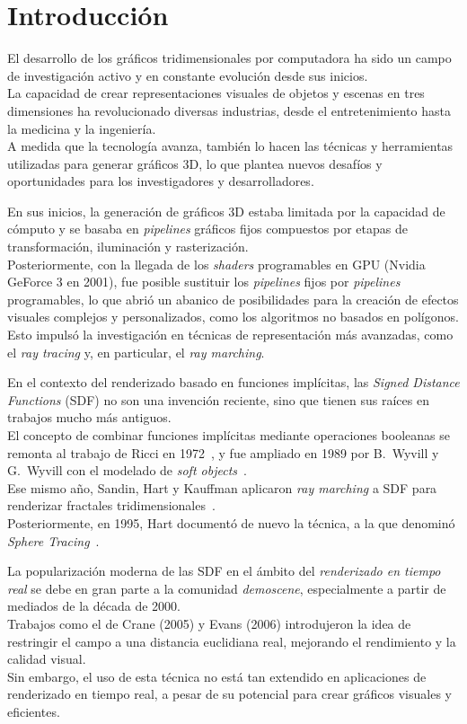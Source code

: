 \chapter{Introducción}
El desarrollo de los gráficos tridimensionales por computadora ha sido un campo
de investigación activo y en constante evolución desde sus inicios.\\ La
capacidad de crear representaciones visuales de objetos y escenas en tres
dimensiones ha revolucionado diversas industrias, desde el entretenimiento
hasta la medicina y la ingeniería.\\ A medida que la tecnología avanza, también
lo hacen las técnicas y herramientas utilizadas para generar gráficos 3D, lo
que plantea nuevos desafíos y oportunidades para los investigadores y
desarrolladores.

En sus inicios, la generación de gráficos 3D estaba limitada por la capacidad
de cómputo y se basaba en \textit{pipelines} gráficos fijos compuestos por
etapas de transformación, iluminación y rasterización.\\ Posteriormente, con la
llegada de los \textit{shaders} programables en GPU (Nvidia GeForce 3 en 2001),
fue posible sustituir los \textit{pipelines} fijos por \textit{pipelines}
programables, lo que abrió un abanico de posibilidades para la creación de
efectos visuales complejos y personalizados, como los algoritmos no basados en
polígonos.\\ Esto impulsó la investigación en técnicas de representación más
avanzadas, como el \textit{ray tracing} y, en particular, el \textit{ray
    marching}.

En el contexto del renderizado basado en funciones implícitas, las
\textit{Signed Distance Functions} (SDF) no son una invención reciente, sino
que tienen sus raíces en trabajos mucho más antiguos.\\ El concepto de combinar
funciones implícitas mediante operaciones booleanas se remonta al trabajo de
Ricci en 1972~\cite{Ricci:1973:CGC}, y fue ampliado en 1989 por B.~Wyvill y
G.~Wyvill con el modelado de \textit{soft objects}~\cite{wyvill1989}.\\ Ese
mismo año, Sandin, Hart y Kauffman aplicaron \textit{ray marching} a SDF para
renderizar fractales tridimensionales~\cite{hart1989ray}.\\ Posteriormente, en
1995, Hart documentó de nuevo la técnica, a la que denominó \textit{Sphere
    Tracing}~\cite{hart1996}.

La popularización moderna de las SDF en el ámbito del \textit{renderizado en
    tiempo real} se debe en gran parte a la comunidad \textit{demoscene},
especialmente a partir de mediados de la década de 2000.\\ Trabajos como el de
Crane (2005) y Evans (2006) introdujeron la idea de restringir el campo a una
distancia euclidiana real, mejorando el rendimiento y la calidad visual.\\ Sin
embargo, el uso de esta técnica no está tan extendido en aplicaciones de
renderizado en tiempo real, a pesar de su potencial para crear gráficos
visuales y eficientes.
